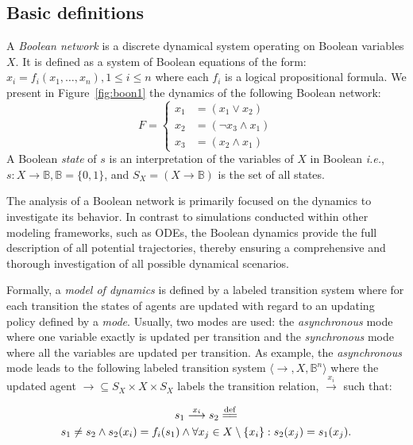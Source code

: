 \documentclass[numsec,webpdf,modern,large]{oup-authoring-template}
\newcommand{\tuple}[1]{\langle #1 \rangle}
\newcommand{\Bool}{{\mathbb B}}
\newcommand{\evo}[0]{\longrightarrow}
\newcommand{\xevo}[1]{\stackrel{#1}{\evo}}
\newcommand{\abbrev}[1]{#1, \relax}
\newcommand{\ie}[0]{\abbrev{\textit{i.e.}}}
\newcommand{\eqdef}{\overset{\text{def}}{=\mathrel{\mkern-3mu}=}}
\begin{document}
	\subsection{Basic definitions}
	\label{subsec:basic-definitions}
	A \emph{Boolean network} is a discrete dynamical system operating on Boolean variables $X$.
	It is defined as a system of Boolean equations of the form: $ x_i = {f_{i}}(x_1,\ldots,x_n), 1 \leq i \leq n$ where each $f_i$ is a logical propositional formula.
	We present in Figure~\ref{fig:boon1} the dynamics of the following Boolean network:
	\begin{equation}
			F= \left\{
		\begin{aligned}
			x_1 &=\left(x_1 \lor x_2\right) \\
			x_2 &=\left(\neg x_3\land x_1\right)\\
			x_3 &=\left(x_2\land x_1\right)
		\end{aligned}\right.
		\label{eq:boon}
	\end{equation}
	A Boolean \emph{state} of $s$ is an interpretation of the variables of $X$ in Boolean \ie $s:X \to \Bool, \Bool = \{0,1\}$, and $S_X = ( X \to \mathbb{B})$ is  the set of all states.

	The analysis of a Boolean network is primarily focused on the dynamics to investigate its behavior. In contrast to simulations conducted within other modeling frameworks, such as ODEs, the Boolean dynamics provide the full description of all potential trajectories, thereby ensuring a comprehensive and thorough investigation of all possible dynamical scenarios.

	Formally, a \emph{model of dynamics} is defined by a labeled transition system where for each transition the states of agents are updated with regard to an updating policy defined by a \emph{mode}.
	 Usually, two modes are used: the \emph{asynchronous} mode where one variable exactly is updated per transition and the \emph{synchronous} mode where all the variables are updated per transition.
	 As example, the \emph{asynchronous} mode leads to the following labeled transition system $\tuple{\evo,X,\Bool^n}$ where the updated agent $\evo \subseteq S_X \times X \times S_X$ labels the transition relation, $\xevo{x_i}$ such that:
	
	\begin{multline*}
		s_1 \xevo{x_i} s_2 \eqdef \\
		s_1\neq s_2 \land s_2(x_i)=f_i(s_1) \land \forall x_j \in X \setminus \{x_i\}: s_2(x_j)=s_1(x_j).
	\end{multline*}
\end{document}
